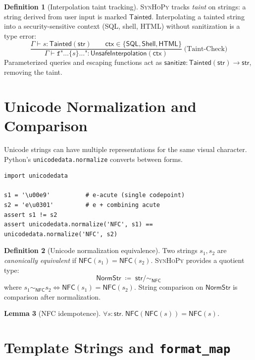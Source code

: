\documentclass[11pt,a4paper]{report}
\theoremstyle{definition}
\newtheorem{definition}{Definition}[chapter]
\theoremstyle{plain}
\newtheorem{lemma}[definition]{Lemma}
\newcommand{\defeq}{\coloneqq}
\newcommand{\synhopy}{\textsc{SynHoPy}}
\begin{document}
\begin{definition}[Interpolation taint tracking]
\synhopy{} tracks \emph{taint} on strings: a string derived from user input
is marked $\mathsf{Tainted}$.  Interpolating a tainted string into a
security-sensitive context (SQL, shell, HTML) without sanitization is a
type error:
\[
  \frac{
    \Gamma \vdash s : \mathsf{Tainted}(\mathsf{str}) \qquad
    \mathsf{ctx} \in \{\mathsf{SQL}, \mathsf{Shell}, \mathsf{HTML}\}
  }{
    \Gamma \vdash \texttt{f"}\ldots\{s\}\ldots\texttt{"} :
    \mathsf{UnsafeInterpolation}(\mathsf{ctx})
  }
  \;\text{(Taint-Check)}
\]
Parameterized queries and escaping functions act as
$\mathsf{sanitize} : \mathsf{Tainted}(\mathsf{str}) \to \mathsf{str}$,
removing the taint.
\end{definition}

\section{Unicode Normalization and Comparison}

Unicode strings can have multiple representations for the same visual
character.  Python's \texttt{unicodedata.normalize} converts between forms.

\begin{lstlisting}[style=python]
import unicodedata

s1 = '\u00e9'          # e-acute (single codepoint)
s2 = 'e\u0301'         # e + combining acute
assert s1 != s2
assert unicodedata.normalize('NFC', s1) == unicodedata.normalize('NFC', s2)
\end{lstlisting}

\begin{definition}[Unicode normalization equivalence]
Two strings $s_1, s_2$ are \emph{canonically equivalent} if
$\mathsf{NFC}(s_1) = \mathsf{NFC}(s_2)$.  \synhopy{} provides a
quotient type:
\[
  \mathsf{NormStr} \;\defeq\; \mathsf{str} / {\sim_{\mathsf{NFC}}}
\]
where $s_1 \sim_{\mathsf{NFC}} s_2 \iff \mathsf{NFC}(s_1) = \mathsf{NFC}(s_2)$.
String comparison on $\mathsf{NormStr}$ is comparison after normalization.
\end{definition}

\begin{lemma}[NFC idempotence]
$\forall s : \mathsf{str}.\; \mathsf{NFC}(\mathsf{NFC}(s)) = \mathsf{NFC}(s)$.
\end{lemma}

\section{Template Strings and \texttt{format\_map}}
\end{document}
